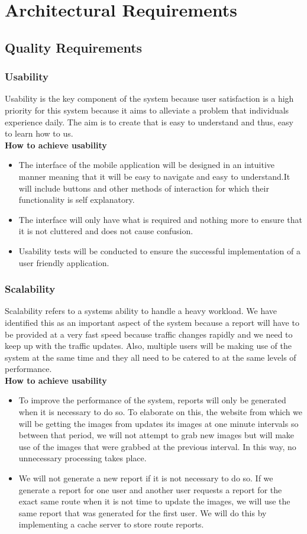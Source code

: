 \documentclass[a4paper,12pt]{article}
\begin{document}
\section{Architectural Requirements}
\subsection{Quality Requirements}
\subsubsection{Usability}
Usability is the key component of the system because user satisfaction is a high priority for this system because it aims to alleviate a problem that individuals experience daily. The aim is to create that is easy to understand and thus, easy to learn how to us. \\
\textbf{How to achieve usability}
\begin{itemize}
\item The interface of the mobile application will be designed in an intuitive manner meaning that it will be easy to navigate and easy to understand.It will include buttons and other methods of interaction for which their functionality is self explanatory.
\item The interface will only have what is required and nothing more to ensure that it is not cluttered and does not cause confusion.
\item Usability tests will be conducted to ensure the successful implementation of a user friendly application.
\end{itemize}
\subsubsection{Scalability}
Scalability refers to a systems ability to handle a heavy workload. We have identified this as an important aspect of the system because a report will have to be provided at a very fast speed because traffic changes rapidly and we need to keep up with the traffic updates. Also, multiple users will be making use of the system at the same time and they all need to be catered to at the same levels of performance. \\
\textbf{How to achieve usability}
\begin{itemize}
\item To improve the performance of the system, reports will only be generated when it is necessary to do so. To elaborate on this, the website from which we will be getting the images from updates its images at one minute intervals so between that period, we will not attempt to grab new images but will make use of the images that were grabbed at the previous interval. In this way, no unnecessary processing takes place.
\item We will not generate a new report if it is not necessary to do so. If we generate a report for one user and another user requests a report for the exact same route when it is not time to update the images, we will use the same report that was generated for the first user. We will do this by implementing a cache server to store route reports.  
\end{itemize}
\end{document}

